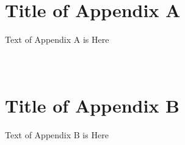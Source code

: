 \newpage
\appendix
\section{\\Title of Appendix A} \label{App:AppendixA}

Text of Appendix A is Here

\newpage
\section{\\Title of Appendix B} \label{App:AppendixB}

Text of Appendix B is Here